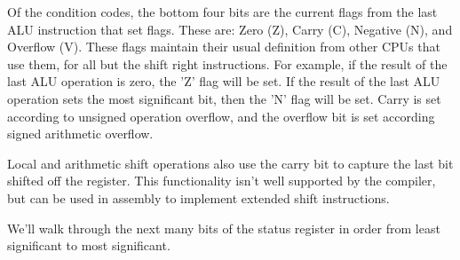 \documentclass{gqtekspec}
\begin{document}
Of the condition codes, the bottom four bits are the current flags from the
last ALU instruction that set flags.  These are:
		Zero (Z),
		Carry (C),
		Negative (N),
		and Overflow (V).
These flags maintain their usual definition from other CPUs that use them, for
all but the shift right instructions.  For example, if the result of the last
ALU operation is zero, the 'Z' flag will be set.  If the result of the last
ALU operation sets the most significant bit, then the 'N' flag will be set.
Carry is set according to unsigned operation overflow, and the overflow bit
is set according signed arithmetic overflow.

Local and arithmetic shift operations also use the carry bit to capture the
last bit shifted off the register.  This functionality isn't well supported
by the compiler, but can be used in assembly to implement extended shift
instructions.

We'll walk through the next many bits of the status register in order from
least significant to most significant.
\end{document}
